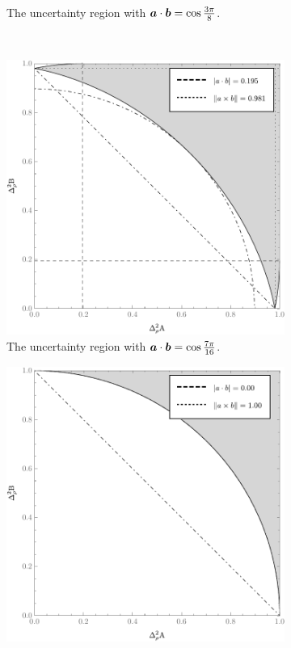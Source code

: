 \begin{figure}[ht]
\begin{subfigure}[b]{0.4\textwidth}
    \caption{The uncertainty region with $\bm{a}\cdot\bm{b} = \cos\frac{3\pi}{8}$.}
    \label{fig:err-region-3pi-by-8}
  \end{subfigure}\\
  \begin{subfigure}[b]{0.4\textwidth}\centering
    \includegraphics[width=\textwidth]{figs/new-qubit-error-region-with-upper-and-lower-bounds-7-pi-by-16-bw}
    \caption{The uncertainty region with $\bm{a}\cdot\bm{b} = \cos\frac{7\pi}{16}$.}
    \label{fig:err-region-7pi-by-16}
  \end{subfigure}\hfill
  \begin{subfigure}[b]{0.4\textwidth}\centering
    \includegraphics[width=\textwidth]{figs/new-qubit-error-region-with-upper-and-lower-bounds-pi-by-2-bw}

\end{subfigure}
\end{figure}
